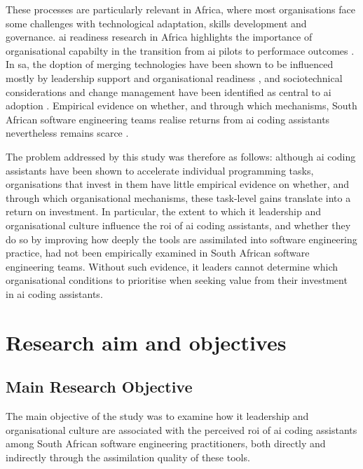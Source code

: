 These processes are particularly relevant in Africa, where most organisations face some challenges with technological adaptation, skills development and governance. \gls{ai} readiness research in Africa highlights the importance of organisational capabilty in the transition from \gls{ai} pilots to performace outcomes \parencite{Isagah2024}. In \gls{sa}, the doption of merging technologies have been shown to be influenced mostly by leadership support and organisational readiness \parencite{Matsepe2022}, and sociotechnical considerations and change management have been identified as central to \gls{ai} adoption \parencite{Smit2024}. Empirical evidence on whether, and through which mechanisms, South African software engineering teams realise returns from \gls{ai} coding assistants nevertheless remains scarce \parencite{Poisat2024, Muzuva2024}.

The problem addressed by this study was therefore as follows: although \gls{ai} coding assistants have been shown to accelerate individual programming tasks, organisations that invest in them have little empirical evidence on whether, and through which organisational mechanisms, these task-level gains translate into a return on investment. In particular, the extent to which \gls{it} leadership and organisational culture influence the \gls{roi} of \gls{ai} coding assistants, and whether they do so by improving how deeply the tools are assimilated into software engineering practice, had not been empirically examined in South African software engineering teams. Without such evidence, \gls{it} leaders cannot determine which organisational conditions to prioritise when seeking value from their investment in \gls{ai} coding assistants.

\section{Research aim and objectives} 
\label{sec:Research aim and objectives} 

\subsection{Main Research Objective}
\label{sec:Main Research Objective}

The main objective of the study was to examine how \gls{it} leadership and organisational culture are associated with the perceived \gls{roi} of \gls{ai} coding assistants among South African software engineering practitioners, both directly and indirectly through the assimilation quality of these tools.

